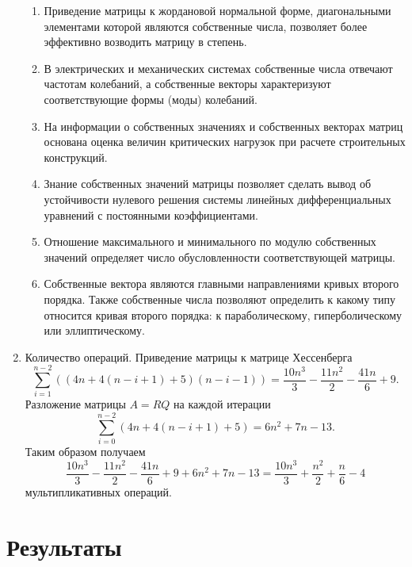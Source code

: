 \documentclass[12pt, a4paper]{article}
\begin{document}
\begin{enumerate}
		\begin{enumerate}[label=(\arabic*)]
			\item Приведение матрицы к жордановой нормальной форме, диагональными элементами которой являются собственные числа, позволяет более эффективно возводить матрицу в степень.
			\item В электрических и механических системах собственные числа отвечают частотам колебаний, а собственные векторы характеризуют соответствующие формы (моды) колебаний.
			\item На информации о собственных значениях и собственных векторах матриц основана оценка величин критических нагрузок при расчете строительных конструкций.
			\item Знание собственных значений матрицы позволяет сделать вывод об устойчивости нулевого решения системы линейных дифференциальных уравнений с постоянными коэффициентами.
			\item Отношение максимального и минимального по модулю собственных значений определяет число обусловленности соответствующей матрицы.
			\item Собственные вектора являются главными направлениями кривых второго порядка. Также собственные числа позволяют определить к какому типу относится кривая второго порядка: к параболическому, гиперболическому или эллиптическому.
		\end{enumerate}
		\smallskip
\item Количество операций.
Приведение матрицы к матрице Хессенберга
\[
\sum_{i=1}^{n-2}((4n+4(n-i+1)+5)(n-i-1)) = \frac{10n^3}{3}-\frac{11n^2}{2}-\frac{41n}{6}+9.
\]
Разложение матрицы $A = RQ$ на каждой итерации
\[
\sum_{i=0}^{n-2}(4n+4(n-i+1)+5) = 6n^2+7n-13.
\]
Таким образом получаем
\[
\frac{10n^3}{3}-\frac{11n^2}{2}-\frac{41n}{6}+9+6n^2+7n-13 = \frac{10n^3}{3}+\frac{n^2}{2}+\frac{n}{6}-4
\]
мультипликативных операций.

	\end{enumerate}
	\newpage
	\section{Результаты}
	
\end{document}
